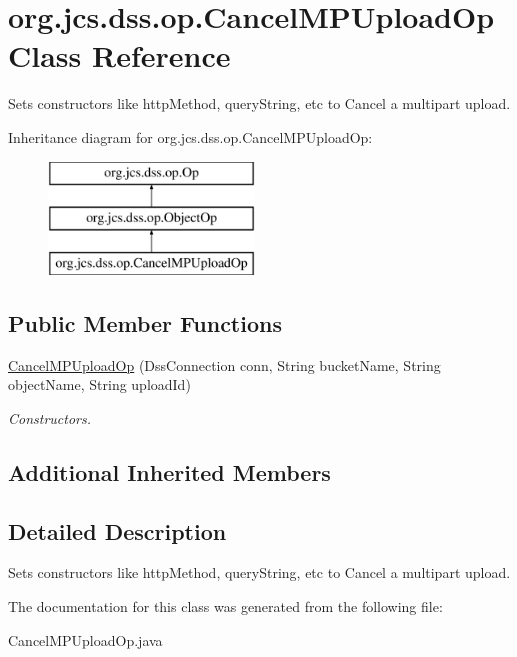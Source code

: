 \hypertarget{classorg_1_1jcs_1_1dss_1_1op_1_1CancelMPUploadOp}{}\section{org.\+jcs.\+dss.\+op.\+Cancel\+M\+P\+Upload\+Op Class Reference}
\label{classorg_1_1jcs_1_1dss_1_1op_1_1CancelMPUploadOp}


Sets constructors like http\+Method, query\+String, etc to Cancel a multipart upload.  


Inheritance diagram for org.\+jcs.\+dss.\+op.\+Cancel\+M\+P\+Upload\+Op\+:\begin{figure}[H]
\begin{center}
\leavevmode
\includegraphics[height=3.000000cm]{classorg_1_1jcs_1_1dss_1_1op_1_1CancelMPUploadOp}
\end{center}
\end{figure}
\subsection*{Public Member Functions}
\begin{DoxyCompactItemize}
\item 
\hyperlink{classorg_1_1jcs_1_1dss_1_1op_1_1CancelMPUploadOp_acaad0e61e579534a67fc4bdd47291750}{Cancel\+M\+P\+Upload\+Op} (Dss\+Connection conn, String bucket\+Name, String object\+Name, String upload\+Id)\hypertarget{classorg_1_1jcs_1_1dss_1_1op_1_1CancelMPUploadOp_acaad0e61e579534a67fc4bdd47291750}{}\label{classorg_1_1jcs_1_1dss_1_1op_1_1CancelMPUploadOp_acaad0e61e579534a67fc4bdd47291750}

\begin{DoxyCompactList}\small\item\em Constructors. \end{DoxyCompactList}\end{DoxyCompactItemize}
\subsection*{Additional Inherited Members}


\subsection{Detailed Description}
Sets constructors like http\+Method, query\+String, etc to Cancel a multipart upload. 

The documentation for this class was generated from the following file\+:\begin{DoxyCompactItemize}
\item 
Cancel\+M\+P\+Upload\+Op.\+java\end{DoxyCompactItemize}
